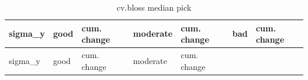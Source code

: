 \documentclass[
  letterpaper,
  DIV=11,
  numbers=noendperiod]{scrartcl}
\begin{document}
\begin{longtable}[]{@{}
  >{\raggedleft\arraybackslash}p{}
  >{\raggedleft\arraybackslash}p{}
  >{\raggedleft\arraybackslash}p{}
  >{\raggedleft\arraybackslash}p{}
  >{\raggedleft\arraybackslash}p{}
  >{\raggedleft\arraybackslash}p{}
  >{\raggedleft\arraybackslash}p{}@{}}
\caption{cv.bloss median pick}\tabularnewline
\toprule\noalign{}
\begin{minipage}[b]{\linewidth}\raggedleft
sigma\_y
\end{minipage} & \begin{minipage}[b]{\linewidth}\raggedleft
good
\end{minipage} & \begin{minipage}[b]{\linewidth}\raggedleft
cum. change
\end{minipage} & \begin{minipage}[b]{\linewidth}\raggedleft
moderate
\end{minipage} & \begin{minipage}[b]{\linewidth}\raggedleft
cum. change
\end{minipage} & \begin{minipage}[b]{\linewidth}\raggedleft
bad
\end{minipage} & \begin{minipage}[b]{\linewidth}\raggedleft
cum. change
\end{minipage} \\
\midrule\noalign{}
\endfirsthead
\toprule\noalign{}
\begin{minipage}[b]{\linewidth}\raggedleft
sigma\_y
\end{minipage} & \begin{minipage}[b]{\linewidth}\raggedleft
good
\end{minipage} & \begin{minipage}[b]{\linewidth}\raggedleft
cum. change
\end{minipage} & \begin{minipage}[b]{\linewidth}\raggedleft
moderate
\end{minipage} & \begin{minipage}[b]{\linewidth}\raggedleft
cum. change
\end{minipage} & \begin{minipage}[b]{\linewidth}\raggedleft

\end{minipage}
\end{longtable}
\end{document}
